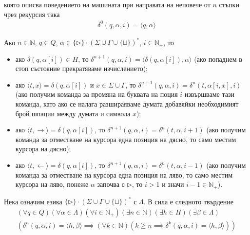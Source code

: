 \documentclass[14pt]{extarticle}
\begin{document}
която описва поведението на машината при направата на неповече от \(n\) стъпки
чрез рекурсия така
\begin{align*}
    \delta^0(q, \alpha, i) = \langle q, \alpha \rangle
\end{align*}

Ако \(n \in \mathbb N\), \(q \in Q\), \(\alpha \in \{\triangleright\} \cdot (\Sigma \cup \Gamma \cup \{\sqcup\})^* \), \(i \in \mathbb{N}_+\), то

\begin{itemize}
    \item ако \(\delta(q, \alpha[i]) \in H\), то \(\delta^{n + 1}(q, \alpha, i) = \langle \delta(q, \alpha[i]), \alpha \rangle \) (ако попаднем в стоп състояние прекратяваме изчислението);
    \item ако \(\langle t, x \rangle = \delta(q, \alpha[i])\) и \(x \in \Sigma \cup \Gamma\), то \(\delta^{n + 1}(q, \alpha, i) = \delta^n(t, \alpha[i, x], i)\) (ако получим команда за промяна на буквата на поция \(i\) извършваме тази команда, като ако се налага разшираяваме думата добавяйки необходимият брой шпации между думата и символа \(x\));
    \item ако \(\langle t, \rightarrow \rangle = \delta(q, \alpha[i])\), то \(\delta^{n + 1}(q, \alpha, i) = \delta^n(t, \alpha, i + 1)\) (ако получим команда за отместване на курсора една позиция на дясно, то само местим курсора на дясно);
    \item ако \(\langle t, \leftarrow \rangle = \delta(q, \alpha[i])\), то \(\delta^{n + 1}(q, \alpha, i) = \delta^n(t, \alpha, i - 1)\) (ако получим команда за отместване на курсора една позиция на ляво, то само местим курсора на ляво, понеже \(\alpha\) започва с \(\triangleright\), то \(i > 1\) и значи \(i - 1 \in \mathbb{N}_+\)).
\end{itemize}

Нека означим езика \(\{\triangleright\} \cdot (\Sigma \cup \Gamma \cup \{\sqcup\})^*\) с \(\Lambda\). В сила е следното твърдение
\begin{align*}
    (\forall q \in Q)(\forall \alpha \in \Lambda)(\forall i \in \mathbb{N}_+)(\exists n \in \mathbb N)(\exists h \in H)(\exists \beta \in \Lambda)\\
    (\delta^n(q, \alpha, i) = \langle h, \beta \rangle \implies (\forall k \in \mathbb N)(k \geq n \implies \delta^k(q, \alpha, i) = \langle h, \beta \rangle) )
\end{align*}
\end{document}
